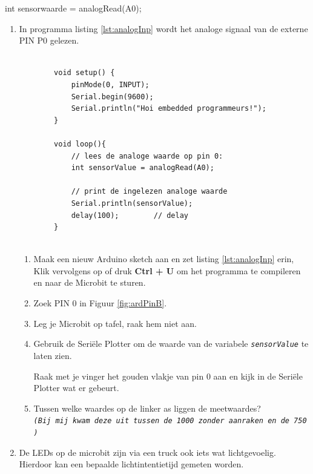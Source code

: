 int sensorwaarde = \textcolor{arduinoOrange}{analogRead}(A0);

\begin{enumerate}
	\item In programma listing \ref{lst:analogInp} wordt het analoge signaal van de externe PIN P0 gelezen.
	\begin{lstlisting}[numbers=none ,caption= inlezen via een analoog signaal.,label={lst:analogInp}]
	
		void setup() {  
			pinMode(0, INPUT); 
			Serial.begin(9600);
			Serial.println("Hoi embedded programmeurs!");
		}
		
		void loop(){
			// lees de analoge waarde op pin 0:
			int sensorValue = analogRead(A0);
			
			// print de ingelezen analoge waarde
			Serial.println(sensorValue);
			delay(100);        // delay 
		}
		
	\end{lstlisting}
	\begin{enumerate}
		\item  Maak een nieuw Arduino sketch aan en zet listing \ref{lst:analogInp} erin, Klik vervolgens op  of druk \colorbox{mygray}{\textbf{Ctrl + U}} om het programma te compileren en naar de Microbit te sturen. 
		\item Zoek PIN 0 in Figuur \ref{fig:ardPinB}.
		\item Leg je Microbit op tafel, raak hem niet aan. 
		\item Gebruik de Seriële Plotter om de waarde van de variabele \texttt{\textit{sensorValue}}  te laten zien.
		
		Raak met je vinger het gouden vlakje van pin 0 aan en kijk in de Seriële Plotter wat er gebeurt.
		\item Tussen welke waardes op de linker as liggen de meetwaardes? \hrulefill \\	
		\footnotesize{\texttt{\textit{(Bij mij kwam deze uit tussen de 1000 zonder aanraken en de 750 )}} }
		
	\end{enumerate}
	
	\item De LEDs op de microbit zijn via een truck ook iets wat lichtgevoelig. Hierdoor kan een  bepaalde lichtintentietijd gemeten worden. 
	

\end{enumerate}
